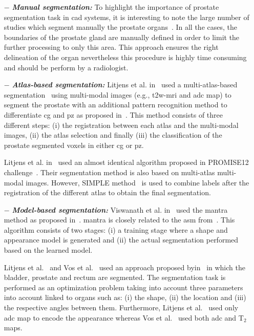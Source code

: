 \begin{enumerate}[leftmargin=*]

\item[$-$] \textbf{\textit{Manual segmentation:}} To highlight the importance of prostate segmentation task in \ac{cad} systems, it is interesting to note the large number of studies which segment manually the prostate organs~\cite{Artan2009,Artan2010,Matulewicz2013,Niaf2011,Niaf2012,Ozer2009,Ozer2010,Puech2009,Vos2008,Vos2008a}. In all the cases, the boundaries of the prostate gland are manually defined in order to limit the further processing to only this area. This approach ensures the right delineation of the organ nevertheless this procedure is highly time consuming and should be perform by a radiologist.

\item[$-$] \textbf{\textit{Atlas-based segmentation:}} Litjens et al. in~\cite{Litjens2012} used a multi-atlas-based segmentation~\cite{Klein2008} using multi-modal images (e.g., \ac{t2w}-\ac{mri} and \ac{adc} map) to segment the prostate with an additional pattern recognition method to differentiate \ac{cg} and \ac{pz} as proposed in~\cite{Litjens2012a}. This method consists of three different steps: (i) the registration between each atlas and the multi-modal images, (ii) the atlas selection and finally (iii) the classification of the prostate segmented voxels in either \ac{cg} or \ac{pz}. 

  Litjens et al. in~\cite{Litjens2014} used an almost identical algorithm proposed in PROMISE12 challenge~\cite{Litjens2014a}. Their segmentation method is also based on multi-atlas multi-modal images. However, SIMPLE method~\cite{Langerak2010} is used to combine labels after the registration of the different atlas to obtain the final segmentation.

\item[$-$] \textbf{\textit{Model-based segmentation:}} Viswanath et al. in~\cite{Viswanath2008a,Viswanath2009} used the \ac{mantra} method as proposed in~\cite{Toth2008}. \ac{mantra} is closely related to the \ac{asm} from~\cite{Cootes1995}. This algorithm consists of two stages: (i) a training stage where a shape and appearance model is generated and (ii) the actual segmentation performed based on the learned model. 

  Litjens et al.~\cite{Litjens2011} and Vos et al.~\cite{Vos2012} used an approach proposed byin~\cite{Huisman2010} in which the bladder, prostate and rectum are segmented. The segmentation task is performed as an optimization problem taking into account three parameters into account linked to organs such as: (i) the shape, (ii) the location and (iii) the respective angles between them. Furthermore, Litjens et al.~\cite{Litjens2011} used only \ac{adc} map to encode the appearance whereas Vos et al.~\cite{Vos2012} used both \ac{adc} and T$_2$ maps.

\end{enumerate}

